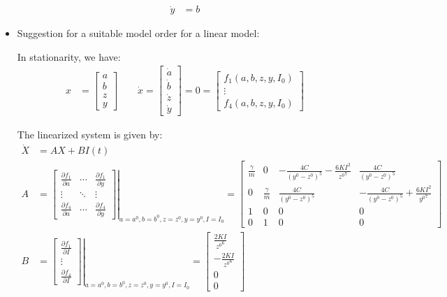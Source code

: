 \documentclass[10pt,a4paper]{article}
\begin{document}
\begin{itemize}
\begin{align*}
		\dot{y} &= b
	\end{align*}
	\item Suggestion for a suitable model order for a linear model:
	\par In stationarity, we have:
	\begin{align*}
		x &= \begin{bmatrix} a \\ b \\ z \\ y \end{bmatrix} \qquad \dot{x} = \begin{bmatrix} \dot{a} \\ \dot{b} \\ \dot{z} \\ \dot{y} \end{bmatrix} = 0 = \begin{bmatrix} f_{1}(a, b, z, y, I_{0}) \\ \vdots \\ f_{4}(a, b, z, y, I_{0}) \end{bmatrix}
	\end{align*}
	\par The linearized system is given by:
	\begin{align*}
		\dot{X} &= A X + B I(t) \\
		A &= \left. \begin{bmatrix} \frac{\partial f_{1}}{\partial a} & \cdots & \frac{\partial f_{1}}{\partial y} \\ \vdots & \ddots & \vdots \\ \frac{\partial f_{4}}{\partial a} & \cdots & \frac{\partial f_{4}}{\partial y} \end{bmatrix} \right|_{a = a^{0}, b = b^{0}, z = z^{0}, y = y^{0}, I = I_{0}} = \begin{bmatrix} \frac{\gamma}{m} & 0 & - \frac{4 C}{(y^{0} - z^{0})^{5}} - \frac{6 K I^{2}}{{z^{0}}^{7}} & \frac{4 C}{(y^{0} - z^{0})^{5}} \\ 0 & \frac{\gamma}{m} & \frac{4 C}{(y^{0} - z^{0})^{5}} & - \frac{4 C}{(y^{0} - z^{0})^{5}} + \frac{6 K I^{2}}{{y^{0}}^{7}} \\ 1 & 0 & 0 & 0 \\ 0 & 1 & 0 & 0 \end{bmatrix} \\ 
		B &= \left. \begin{bmatrix} \frac{\partial f_{1}}{\partial I} \\ \vdots \\ \frac{\partial f_{4}}{\partial I} \end{bmatrix} \right|_{a = a^{0}, b = b^{0}, z = z^{0}, y = y^{0}, I = I_{0}} = \begin{bmatrix} \frac{2 K I}{{z^{0}}^{6}} \\ - \frac{2 K I}{{z^{0}}^{6}} \\ 0 \\ 0 \end{bmatrix}

\end{align*}
\end{itemize}
\end{document}
